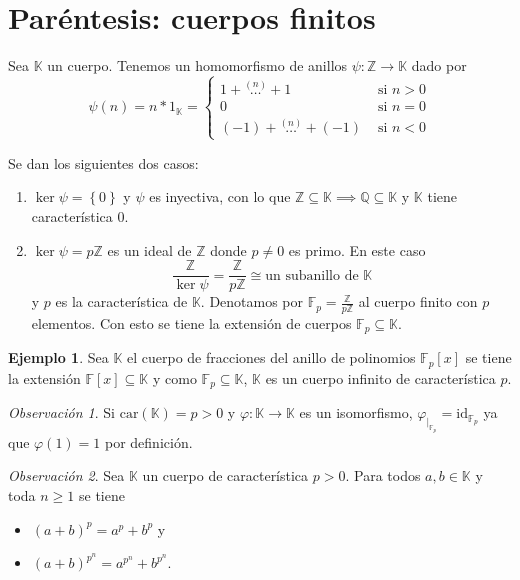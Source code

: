 \documentclass[10pt, spanish]{report}
\theoremstyle{definition}
\newtheorem*{ej}{Ejemplo}
\theoremstyle{custom}
\theoremstyle{remark}
\newtheorem*{obs}{Observación}
\newcommand{\Z}{\mathbb{Z}}
\newcommand{\Q}{\mathbb{Q}}
\newcommand{\F}{\mathbb{F}}
\newcommand{\K}{\mathbb{K}}
\newcommand{\id}{\text{id}}
\newcommand{\car}[1]{\text{car}(#1)}
\renewcommand{\geq}{\geqslant}
\begin{document}
\section{Paréntesis: cuerpos finitos}

Sea $\K$ un cuerpo. Tenemos un homomorfismo de anillos $\psi:\Z\to\K$ dado por
\[\psi(n)=n*1_\K=
    \begin{cases}
        1+\stackrel{(n)}{\ldots}+1& \text{ si } n>0\\
        0& \text{ si } n=0\\
        (-1)+\stackrel{(n)}{\ldots}+(-1)& \text{ si } n<0
    \end{cases}
\]

Se dan los siguientes dos casos:
\begin{enumerate}
    \item $\ker{\psi}=\left\{ 0 \right\}$ y $\psi$ es inyectiva, con lo que
        $\Z\subseteq\K \implies \Q\subseteq\K$ y $\K$ tiene característica 0.
    \item $\ker{\psi}=p\Z$ es un ideal de $\Z$ donde $p\neq 0$ es primo. En este
        caso \[\frac{\Z}{\ker{\psi}}=\frac{\Z}{p\Z}\cong\text{un subanillo de
        }\K\] y $p$ es la característica de $\K$. Denotamos por $\F_p=\frac{\Z}
        {p\Z}$ al cuerpo finito con $p$ elementos. Con esto se tiene la
        extensión de cuerpos $\F_p\subseteq\K$.
\end{enumerate}

\begin{ej}
    Sea $\K$ el cuerpo de fracciones del anillo de polinomios $\F_p[x]$ se tiene
    la extensión $\F[x]\subseteq\K$ y como $\F_p\subseteq\K$, $\K$ es un cuerpo
    infinito de característica $p$.
\end{ej}

\begin{obs}
    Si $\car{\K} = p>0$ y  $\varphi:\K\to\K$ es un isomorfismo,
    $\varphi_{\mid_{\F_p}}=\id_{\F_p}$ ya que $\varphi(1)=1$ por definición.
\end{obs}

\begin{obs}
    Sea $\K$ un cuerpo de característica $p>0$. Para todos $a,b\in\K$ y toda
    $n\geq1$ se tiene
    \begin{itemize}
        \item $(a+b)^p=a^p+b^p$ y
        \item $(a+b)^{p^n}=a^{p^n}+b^{p^n}$.
    \end{itemize}
\end{obs}
\end{document}
